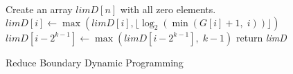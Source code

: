 \begin{algorithm}[!thb]
\SetAlgoNoLine
{}
Create an array $\textit{limD}[n]$ with all zero elements.\;
   {
    $\textit{limD}[i] \gets \max(\textit{limD}[i], \lfloor \log_2(\min(G[i]+1, \; i)) \rfloor)$\;
     {
      $\textit{limD}[i-2^{k-1}] \gets \max(\textit{limD}[i-2^{k-1}], \; k-1)$\;
    }
  }
return \textit{limD}\;

\caption{Reduce Boundary Dynamic Programming}
\label{alg:reduce-boundary}
\end{algorithm}